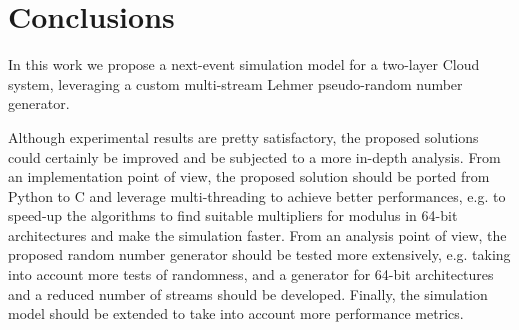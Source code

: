 \section{Conclusions}
\label{sec:conclusions}

In this work we propose a next-event simulation model for a two-layer Cloud system, leveraging a custom multi-stream Lehmer pseudo-random number generator.

Although experimental results are pretty satisfactory, the proposed solutions could certainly be improved and be subjected to a more in-depth analysis.
%
From an implementation point of view, the proposed solution should be ported from Python to C and leverage multi-threading to achieve better performances, e.g. to speed-up the algorithms to find suitable multipliers for modulus in 64-bit architectures and make the simulation faster.
%
From an analysis point of view, the proposed random number generator should be tested more extensively, e.g. taking into account more tests of randomness, and a generator for 64-bit architectures and a reduced number of streams should be developed. Finally, the simulation model should be extended to take into account more performance metrics.

